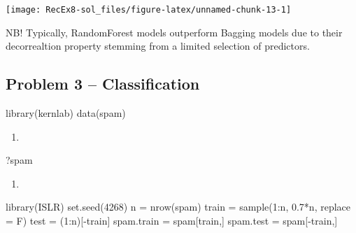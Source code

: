 \documentclass[
]{article}
\newenvironment{Shaded}{\begin{snugshade}}{\end{snugshade}}
\newcommand{\AttributeTok}[1]{\textcolor[rgb]{0.77,0.63,0.00}{#1}}
\newcommand{\DecValTok}[1]{\textcolor[rgb]{0.00,0.00,0.81}{#1}}
\newcommand{\FloatTok}[1]{\textcolor[rgb]{0.00,0.00,0.81}{#1}}
\newcommand{\FunctionTok}[1]{\textcolor[rgb]{0.00,0.00,0.00}{#1}}
\newcommand{\NormalTok}[1]{#1}
\newcommand{\OtherTok}[1]{\textcolor[rgb]{0.56,0.35,0.01}{#1}}
\newcommand{\SpecialCharTok}[1]{\textcolor[rgb]{0.00,0.00,0.00}{#1}}
\providecommand{\tightlist}{%
  \setlength{\itemsep}{0pt}\setlength{\parskip}{0pt}}
\begin{document}
\texttt{[image: RecEx8-sol\_files/figure-latex/unnamed-chunk-13-1]}

NB! Typically, RandomForest models outperform Bagging models due to
their decorrealtion property stemming from a limited selection of
predictors.

\hypertarget{problem-3-classification}{%
\subsection{Problem 3 --
Classification}\label{problem-3-classification}}

\begin{Shaded}
\begin{Highlighting}[]
\FunctionTok{library}\NormalTok{(kernlab)}
\FunctionTok{data}\NormalTok{(spam)}
\end{Highlighting}
\end{Shaded}

\begin{enumerate}
\def\labelenumi{\alph{enumi})}
\tightlist
\item
\end{enumerate}

\begin{Shaded}
\begin{Highlighting}[]
\NormalTok{?spam}
\end{Highlighting}
\end{Shaded}

\begin{enumerate}
\def\labelenumi{\alph{enumi})}
\setcounter{enumi}{1}
\tightlist
\item
\end{enumerate}

\begin{Shaded}
\begin{Highlighting}[]
\FunctionTok{library}\NormalTok{(ISLR)}
\FunctionTok{set.seed}\NormalTok{(}\DecValTok{4268}\NormalTok{)}
\NormalTok{n }\OtherTok{=} \FunctionTok{nrow}\NormalTok{(spam)}
\NormalTok{train }\OtherTok{=} \FunctionTok{sample}\NormalTok{(}\DecValTok{1}\SpecialCharTok{:}\NormalTok{n, }\FloatTok{0.7}\SpecialCharTok{*}\NormalTok{n, }\AttributeTok{replace =}\NormalTok{ F)}
\NormalTok{test }\OtherTok{=}\NormalTok{ (}\DecValTok{1}\SpecialCharTok{:}\NormalTok{n)[}\SpecialCharTok{{-}}\NormalTok{train]}
\NormalTok{spam.train }\OtherTok{=}\NormalTok{ spam[train,]}
\NormalTok{spam.test }\OtherTok{=}\NormalTok{ spam[}\SpecialCharTok{{-}}\NormalTok{train,]}
\end{Highlighting}
\end{Shaded}
\end{document}

